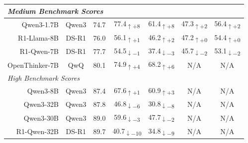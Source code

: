\documentclass{article} %
\begin{document}
\begin{table}[t]
\begin{tabular}{r|c|c|cc|cc}
    \midrule
    \multicolumn{7}{l}{\textit{Medium Benchmark Scores}} \\
    \midrule

    Qwen3-1.7B        & Qwen3 & 74.7 &
    \cellcolor{green!40}77.4\textsubscript{$\uparrow+8$} &
    \cellcolor{green!40}61.4\textsubscript{$\uparrow+8$} &
    \cellcolor{green!20}47.3\textsubscript{$\uparrow+2$} &
    \cellcolor{green!20}56.4\textsubscript{$\uparrow+2$} \\

    R1-Llama-8B       & DS-R1 & 76.0 &
    \cellcolor{green!15}56.1\textsubscript{$\uparrow+1$} &
    \cellcolor{green!20}46.2\textsubscript{$\uparrow+2$} &
    \cellcolor{green!0}47.2\textsubscript{$\uparrow+0$} &
    \cellcolor{green!0}54.4\textsubscript{$\uparrow+0$} \\

    R1-Qwen-7B        & DS-R1 & 77.7 &
    \cellcolor{red!15}54.5\textsubscript{$\downarrow-1$} &
    \cellcolor{red!25}37.4\textsubscript{$\downarrow-3$} &
    \cellcolor{red!20}45.7\textsubscript{$\downarrow-2$} &
    \cellcolor{red!20}53.1\textsubscript{$\downarrow-2$} \\

    OpenThinker-7B    & QwQ   & 80.1 &
    \cellcolor{green!30}74.9\textsubscript{$\uparrow+4$} &
    \cellcolor{green!40}68.2\textsubscript{$\uparrow+6$} &
    N/A & N/A \\

    \midrule
    \multicolumn{7}{l}{\textit{High Benchmark Scores}} \\
    \midrule

    Qwen3-8B          & Qwen3 & 87.4 &
    \cellcolor{green!15}67.6\textsubscript{$\uparrow+1$} &
    \cellcolor{green!25}60.9\textsubscript{$\uparrow+3$} &
    N/A & N/A \\

    Qwen3-32B         & Qwen3 & 87.8 &
    \cellcolor{red!40}46.8\textsubscript{$\downarrow-6$} &
    \cellcolor{red!40}30.8\textsubscript{$\downarrow-8$} &
    N/A & N/A \\

    Qwen3-30B         & Qwen3 & 89.0 &
    \cellcolor{red!25}59.6\textsubscript{$\downarrow-3$} &
    \cellcolor{red!20}47.7\textsubscript{$\downarrow-2$} &
    N/A & N/A \\

    R1-Qwen-32B       & DS-R1 & 89.7 &
    \cellcolor{red!40}40.7\textsubscript{$\downarrow-10$} &
    \cellcolor{red!40}34.8\textsubscript{$\downarrow-9$} &
    N/A & N/A \\


\end{tabular}
\end{table}
\end{document}
